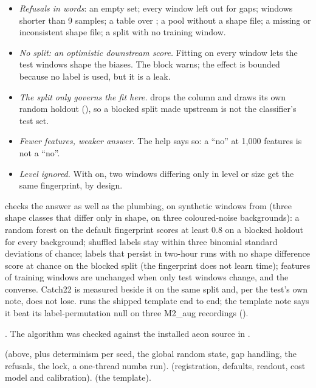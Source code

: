 \begin{itemize}
\item \emph{Refusals in words}: an empty set; every window left out for gaps; windows
  shorter than 9 samples; a table over ; a pool without a shape file; a
  missing or inconsistent shape file; a split with no training window.
\item \emph{No split: an optimistic downstream score.} Fitting on every window lets the
  test windows shape the biases. The block warns; the effect is bounded because no label is
  used, but it is a leak.
\item \emph{The split only governs the fit here.}  drops the
   column and draws its own random holdout (),
  so a blocked split made upstream is not the classifier's test set.
\item \emph{Fewer features, weaker answer.} The  help says so: a ``no'' at
  1{,}000 features is not a ``no''.
\item \emph{Level ignored.} With  on, two windows differing only in level or
  size get the same fingerprint, by design.
\end{itemize}

 checks the answer as well as the plumbing, on synthetic
windows from  (three shape classes that differ only in
shape, on three coloured-noise backgrounds): a random forest on the default fingerprint
scores at least 0.8 on a blocked holdout for every background; shuffled labels stay within
three binomial standard deviations of chance; labels that persist in two-hour runs with no
shape difference score at chance on the blocked split (the fingerprint does not learn time);
features of training windows are unchanged when only test windows change, and the converse.
Catch22 is measured beside it on the same split and, per the test's own note, does not lose.
 runs the shipped template end to end;
the template note says it beat its label-permutation null on three M2\_aug recordings
().

\citet{dempster2021minirocket}. The algorithm was checked against the installed aeon source
in .

 (above, plus determinism per seed, the global random state,
gap handling, the refusals, the lock, a one-thread numba run).
 (registration, defaults, readout, cost model and
calibration).  (the template).
